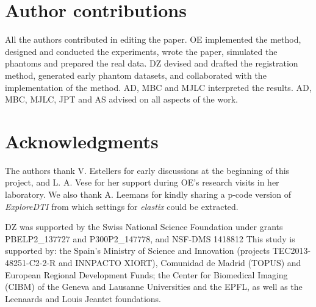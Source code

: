 \section*{Author contributions}
All the authors contributed in editing the paper.
OE implemented the method, designed and conducted the experiments, wrote the paper,
  simulated the phantoms and prepared the real data.
DZ devised and drafted the registration method, generated early phantom datasets, and
  collaborated with the implementation of the method.
AD, MBC and MJLC interpreted the results.
AD, MBC, MJLC, JPT and AS advised on all aspects of the work.

\section*{Acknowledgments}
The authors thank V. Estellers for early discussions at the beginning of this project,
  and L. A. Vese for her support during OE's research visits in her laboratory.
We also thank A. Leemans for kindly sharing a p-code version of \emph{ExploreDTI} from
  which settings for \emph{elastix} could be extracted.

DZ was supported by the Swiss National Science Foundation under grants PBELP2\_137727 
  and P300P2\_147778, and NSF-DMS 1418812
This study is supported by: the Spain's Ministry of Science and Innovation
  (projects TEC2013-48251-C2-2-R and INNPACTO XIORT), Comunidad de Madrid (TOPUS) and
  European Regional Development Funds; the Center for Biomedical Imaging
  (CIBM) of the Geneva and Lausanne Universities and the EPFL, as well as the
  Leenaards and Louis Jeantet foundations.
